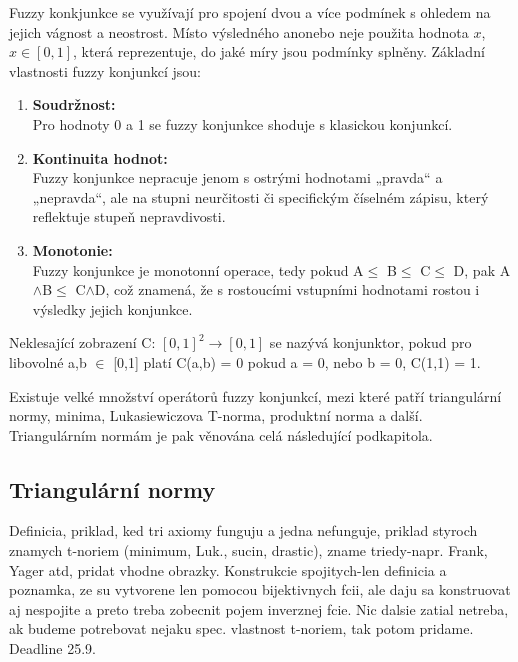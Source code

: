 Fuzzy konkjunkce se využívají pro spojení dvou a více podmínek s ohledem na jejich vágnost a neostrost. Místo výsledného \clqq ano\crqq \space nebo \clqq ne\crqq \space je použita hodnota $x$, $x \in [0,1]$, která reprezentuje, do jaké míry jsou podmínky splněny.  
Základní vlastnosti fuzzy konjunkcí jsou:
\begin{enumerate}
    \item \textbf{Soudržnost:}\\
    Pro hodnoty 0 a 1 se fuzzy konjunkce shoduje s klasickou konjunkcí.
    \item \textbf{Kontinuita hodnot:}\\
    Fuzzy konjunkce nepracuje jenom s  ostrými hodnotami „pravda“ a „nepravda“, ale na stupni neurčitosti či specifickým číselném zápisu, který reflektuje stupeň nepravdivosti.
    \item \textbf{Monotonie:}\\
    Fuzzy konjunkce je monotonní operace, tedy pokud A$\leq$ B$\leq$ C$\leq$ D, pak A$\land$B$\leq$ C$\land$D, což znamená, že s rostoucími vstupními hodnotami rostou i výsledky jejich konjunkce.
\end{enumerate}
\begin{definition}
    \cite{hlinena}
    Neklesající zobrazení C: $[0,1]^2 \rightarrow [0,1]$ se nazývá konjunktor, pokud pro libovolné a,b $\in$ [0,1] platí
    C(a,b) = 0 pokud a = 0, nebo b = 0,
    C(1,1) = 1.
    \end{definition}

\begin{remark}
    Existuje velké množství operátor\r u fuzzy konjunkcí, mezi které patří triangulární normy, minima, Lukasiewiczova T-norma, produktní norma a další. Triangulárním normám je pak věnována celá následující podkapitola.
\end{remark}

\subsection{Triangul\'arn\'i normy} Definicia, priklad, ked tri axiomy funguju a jedna nefunguje, priklad styroch znamych t-noriem (minimum, Luk., sucin, drastic), zname triedy-napr. Frank, Yager atd, pridat vhodne obrazky. Konstrukcie spojitych-len definicia a poznamka, ze su vytvorene len pomocou bijektivnych fcii, ale daju sa konstruovat aj nespojite a preto treba zobecnit pojem inverznej fcie. Nic dalsie zatial netreba, ak budeme potrebovat nejaku spec. vlastnost t-noriem, tak potom pridame. Deadline 25.9.\\


